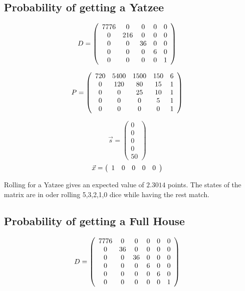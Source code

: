 \subsection{Probability of getting a Yatzee}

\[
D=
\left(
\begin{array}{c c c c c c}
7776& 0 	&0	&0	&0\\
0 	& 216	&0	&0	&0\\
0 	&0		&36	&0	&0\\
0 	&0		&0	&6	&0\\
0 	&0		&0	&0	&1
\end{array}
\right)
\]

\[
P=
\left(
\begin{array}{c c c c c}
720 & 5400 & 1500 & 150 & 6 \\
0 & 120 & 80 & 15 & 1 \\
0 & 0 & 25 & 10 & 1 \\
0 & 0 & 0 & 5 & 1 \\
0 & 0 & 0 & 0 & 1
\end{array}
\right)
\]

\[
\vec{s}=
\left(
\begin{array}{c}
0\\
0\\
0\\
0\\
50
\end{array}
\right)
\]
\[
\vec{x}=
\left(
\begin{array}{c c c c c}
1&0&0&0&0
\end{array}
\right)
\]

Rolling for a Yatzee gives an expected value of $2.3014$ points. The states of
the matrix are in oder rolling 5,3,2,1,0 dice while having the rest match.

\subsection{Probability of getting a Full House}

\[
D=
\left(
\begin{array}{c c c c c c}

7776&0	& 0 	& 0		&0	&0\\
0	&36	& 0 	& 0		&0	&0\\
0 	&0	& 36	& 0		&0	&0\\
0 	&0	& 0		& 6		&0	&0\\
0 	&0	& 0		& 0		&6	&0\\
0 	&0	& 0		& 0		&0	&1
\end{array}
\right)
\]


